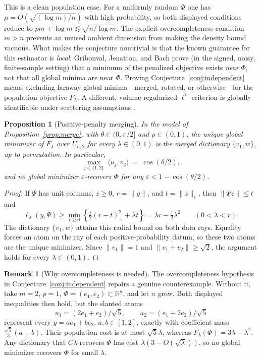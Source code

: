 \documentclass[11pt]{amsart}
\theoremstyle{plain}
\newtheorem{proposition}[theorem]{Proposition}
\theoremstyle{definition}
\newtheorem{remark}[theorem]{Remark}
\newcommand{\R}{\mathbb{R}}
\begin{document}
This is a clean population case. For a uniformly random $\Phi$ one has $\mu=O(\sqrt{(\log m)/n})$ with high probability, so both displayed conditions reduce to $pm+\log m\lesssim\sqrt{n/\log m}$. The explicit overcompleteness condition $m>n$ prevents an unused ambient dimension from making the density bound vacuous. What makes the conjecture nontrivial is that the known guarantee for this estimator is \emph{local}: Gribonval, Jenatton, and Bach \cite{gribonval2015} prove (in the signed, noisy, finite-sample setting) that a minimum of the penalized objective exists \emph{near} $\Phi$, not that all global minima are near $\Phi$. Proving Conjecture~\ref{conj:independent} means excluding faraway global minima---merged, rotated, or otherwise---for the population objective $F_\lambda$. A different, volume-regularized $\ell^1$ criterion is globally identifiable under scattering assumptions \cite{hu2023,sun2025}.

\begin{proposition}[Positive-penalty merging]\label{prop:nested}
In the model of Proposition~\ref{prop:merge}, with $\theta\in(0,\pi/2]$ and $\rho\in(0,1)$, the unique global minimizer of $F_\lambda$ over $U_{n,2}$ for every $\lambda\in(0,1)$ is the merged dictionary $\{v_1,w\}$, up to permutation. In particular,
\[
  \max_{j\in\{1,2\}}\ \langle u_j, v_2\rangle\ =\ \cos(\theta/2),
\]
and no global minimizer $\varepsilon$-recovers $\Phi$ for any $\varepsilon<1-\cos(\theta/2)$.
\end{proposition}

\begin{proof}
If $\Psi$ has unit columns, $z\ge0$, $r=\|y\|$, and $t=\|z\|_1$, then $\|\Psi z\|\le t$ and
\[
\ell_\lambda(y,\Psi)\ge
\min_{t\ge0}\left\{\tfrac12(r-t)_+^2+\lambda t\right\}
=\lambda r-\tfrac12\lambda^2\qquad(0<\lambda<r).
\]
The dictionary $\{v_1,w\}$ attains this radial bound on both data rays. Equality forces an atom on the ray of each positive-probability datum, so these two atoms are the unique minimizer. Since $\|v_1\|=1$ and $\|v_1+v_2\|\ge\sqrt2$, the argument holds for every $\lambda\in(0,1)$.
\end{proof}

\begin{remark}[Why overcompleteness is needed]
The overcompleteness hypothesis in Conjecture~\ref{conj:independent} repairs a genuine counterexample. Without it, take $m=2$, $p=1$, $\Phi=(e_1,e_2)\subset\R^n$, and let $n$ grow. Both displayed inequalities then hold, but the slanted atoms
\[
u_1=(2e_1+e_2)/\sqrt5,\qquad u_2=(e_1+2e_2)/\sqrt5
\]
represent every $y=ae_1+be_2$, $a,b\in[1,2]$, exactly with coefficient mass $\frac{\sqrt5}{3}(a+b)$. Their population cost is at most $\sqrt5\lambda$, whereas $F_\lambda(\Phi)=3\lambda-\lambda^2$. Any dictionary that $C\lambda$-recovers $\Phi$ has cost $\lambda(3-O(\sqrt\lambda))$, so no global minimizer recovers $\Phi$ for small $\lambda$.
\end{remark}
\end{document}
